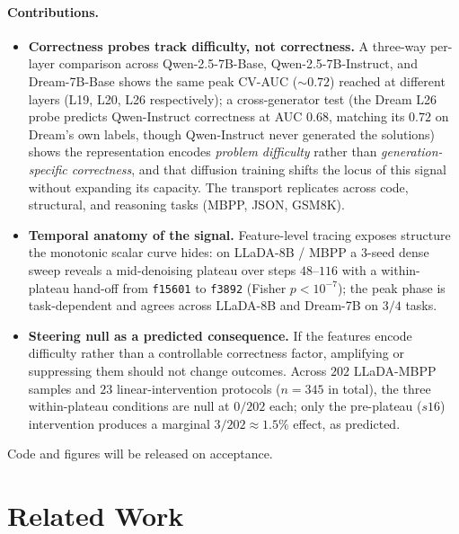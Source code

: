 \documentclass[11pt]{article}
\begin{document}
\paragraph{Contributions.}
\begin{itemize}
\setlength{\itemsep}{0pt}
\item \textbf{Correctness probes track difficulty, not correctness.}
A three-way per-layer comparison across Qwen-2.5-7B-Base, Qwen-2.5-7B-Instruct, and Dream-7B-Base shows the same peak CV-AUC ($\sim$$0.72$) reached at different layers (L19, L20, L26 respectively); a cross-generator test (the Dream L26 probe predicts Qwen-Instruct correctness at AUC $0.68$, matching its $0.72$ on Dream's own labels, though Qwen-Instruct never generated the solutions) shows the representation encodes \emph{problem difficulty} rather than \emph{generation-specific correctness}, and that diffusion training shifts the locus of this signal without expanding its capacity. The transport replicates across code, structural, and reasoning tasks (MBPP, JSON, GSM8K).
\item \textbf{Temporal anatomy of the signal.}
Feature-level tracing exposes structure the monotonic scalar curve hides: on LLaDA-8B / MBPP a 3-seed dense sweep reveals a mid-denoising plateau over steps $48$--$116$ with a within-plateau hand-off from \texttt{f15601} to \texttt{f3892} (Fisher $p\!<\!10^{-7}$); the peak phase is task-dependent and agrees across LLaDA-8B and Dream-7B on $3/4$ tasks.
\item \textbf{Steering null as a predicted consequence.}
If the features encode difficulty rather than a controllable correctness factor, amplifying or suppressing them should not change outcomes. Across $202$ LLaDA-MBPP samples and $23$ linear-intervention protocols ($n{=}345$ in total), the three within-plateau conditions are null at $0/202$ each; only the pre-plateau ($s16$) intervention produces a marginal $3/202\!\approx\!1.5\%$ effect, as predicted.
\end{itemize}
Code and figures will be released on acceptance.

\section{Related Work}
\end{document}
